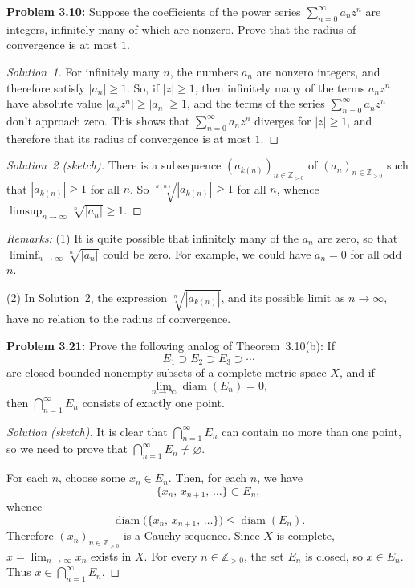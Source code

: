 \documentclass[10pt]{amsart}
\renewcommand{\S}{\subset}
\newcommand{\E}{\varnothing}
\newcommand{\I}{\infty}
\newcommand{\limi}[1]{\lim_{{#1} \to \infty}}
\newcommand{\N}{{\mathbb{Z}}_{> 0}}
\begin{document}
\vspace{2ex}
\noindent
{\textbf{Problem 3.10:}}
Suppose the coefficients of the power series
$\sum_{n = 0}^{\I} a_n z^n$ are integers,
infinitely many of which are nonzero.
Prove that the radius of convergence is at most $1$.

\begin{proof}[Solution~1]
For infinitely many $n$, the numbers $a_n$ are nonzero integers,
and therefore satisfy $| a_n | \geq 1$.
So, if $|z| \geq 1$, then infinitely many of the terms $a_n z^n$
have absolute value $|a_n z^n| \geq | a_n | \geq 1$,
and the terms of the series
$\sum_{n = 0}^{\I} a_n z^n$ don't approach zero.
This shows that $\sum_{n = 0}^{\I} a_n z^n$ diverges for $|z| \geq 1$,
and therefore that its radius of convergence is at most $1$.
\end{proof}

\begin{proof}[Solution~2 (sketch)]
There is a subsequence $(a_{k (n)})_{n \in \N}$
of $(a_n)_{n \in \N}$ such that
$| a_{k (n)} | \geq 1$ for all $n$.
So $\sqrt[k (n)]{| a_{k (n)} |} \geq 1$ for all $n$,
whence $\limsup_{n \to \I} \sqrt[n]{| a_n |} \geq 1$.
\end{proof}


\noindent
{\emph{Remarks:}}
(1) It is quite possible that infinitely many of the $a_n$ are zero,
so that $\liminf_{n \to \I} \sqrt[n]{| a_n |}$ could be zero.
For example, we could have $a_n = 0$ for all odd $n$.

(2) In Solution~2, the expression $\sqrt[n]{| a_{k (n)} |}$, and
its possible limit as $n \to \I$, have no relation to the
radius of convergence.

\vspace{2ex}

\noindent
{\textbf{Problem 3.21:}}
Prove the following analog of Theorem~3.10(b):
If
\[
E_1 \supset E_2 \supset E_3 \supset \cdots
\]
are closed bounded nonempty subsets of a complete metric space $X$,
and if
\[
\limi{n} {\operatorname{diam}} (E_n) = 0,
\]
then $\bigcap_{n = 1}^{\I} E_n$ consists of exactly one point.

\vspace{1ex}

\begin{proof}[Solution (sketch)]
It is clear that $\bigcap_{n = 1}^{\I} E_n$ can contain no more
than one point, so we need to prove that
$\bigcap_{n = 1}^{\I} E_n \neq \E$.

For each $n$, choose some $x_n \in E_n$.
Then, for each $n$, we have
\[
\bigl\{ x_n, \, x_{n + 1}, \, \dots \bigr\} \S E_n,
\]
whence
\[
{\operatorname{diam}}
         \bigl( \bigl\{ x_n, \, x_{n + 1}, \, \dots \bigr\} \bigr)
      \leq {\operatorname{diam}} (E_n).
\]
Therefore $(x_n)_{n \in \N}$ is a Cauchy sequence.
Since $X$ is complete, $x = \limi{n} x_n$ exists in $X$.
For every $n \in \N$,
the set $E_n$ is closed, so $x \in E_n$.
Thus $x \in \bigcap_{n = 1}^{\I} E_n$.
\end{proof}
\end{document}
